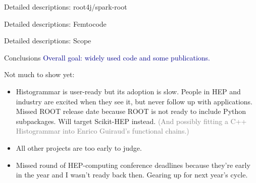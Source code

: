 \documentclass{beamer}
\begin{document}
\begin{frame}{Detailed descriptions: root4j/spark-root}
\end{frame}

\begin{frame}{Detailed descriptions: Femtocode}
\end{frame}

\begin{frame}{Detailed descriptions: Scope}
\end{frame}

\begin{frame}{Conclusions}
\textcolor{darkblue}{Overall goal: widely used code and some publications.}

\vspace{0.25 cm}
Not much to show yet:

\begin{itemize}
\item Histogrammar is user-ready but its adoption is slow. People in HEP and industry are excited when they see it, but never follow up with applications. Missed ROOT release date because ROOT is not ready to include Python subpackages. Will target Scikit-HEP instead. \textcolor{gray}{(And possibly fitting a C++ Histogrammar into Enrico Guiraud's functional chains.)}

\item All other projects are too early to judge.

\item Missed round of HEP-computing conference deadlines because they're early in the year and I wasn't ready back then. Gearing up for next year's cycle.
\end{itemize}
\end{frame}
\end{document}
